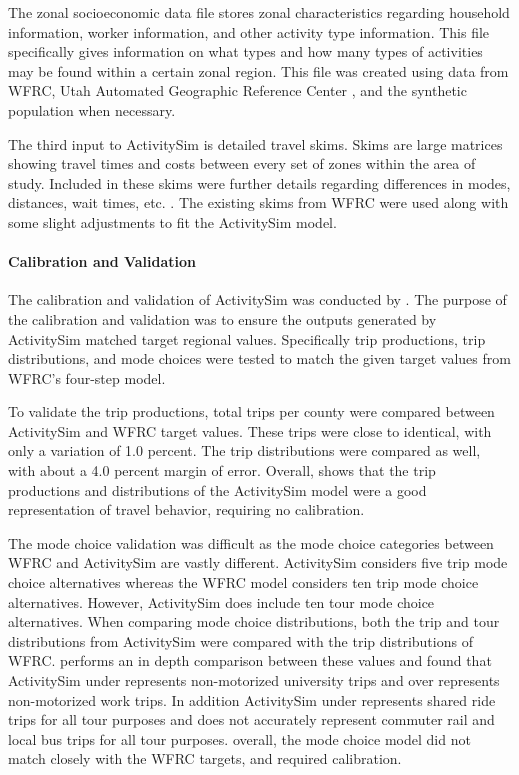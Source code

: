 \documentclass[3p, authoryear, review]{elsarticle} %
\begin{document}
The zonal socioeconomic data file stores zonal characteristics regarding household information, worker information, and other activity type information. This file specifically gives information on what types and how many types of activities may be found within a certain zonal region. This file was created using data from WFRC, Utah Automated Geographic Reference Center \citep{agrc}, and the synthetic population when necessary.

The third input to ActivitySim is detailed travel skims. Skims are large matrices showing travel times and costs between every set of zones within the area of study. Included in these skims were further details regarding differences in modes, distances, wait times, etc. \citep{nate}. The existing skims from WFRC were used along with some slight adjustments to fit the ActivitySim model.

\hypertarget{asimcal}{%
\paragraph{Calibration and Validation}\label{asimcal}}

The calibration and validation of ActivitySim was conducted by \citet{nate}. The purpose of the calibration and validation was to ensure the outputs generated by ActivitySim matched target regional values. Specifically trip productions, trip distributions, and mode choices were tested to match the given target values from WFRC's four-step model.

To validate the trip productions, total trips per county were compared between ActivitySim and WFRC target values. These trips were close to identical, with only a variation of 1.0 percent. The trip distributions were compared as well, with about a 4.0 percent margin of error. Overall, \citet{nate} shows that the trip productions and distributions of the ActivitySim model were a good representation of travel behavior, requiring no calibration.

The mode choice validation was difficult as the mode choice categories between WFRC and ActivitySim are vastly different. ActivitySim considers five trip mode choice alternatives whereas the WFRC model considers ten trip mode choice alternatives. However, ActivitySim does include ten tour mode choice alternatives. When comparing mode choice distributions, both the trip and tour distributions from ActivitySim were compared with the trip distributions of WFRC. \citet{nate} performs an in depth comparison between these values and found that ActivitySim under represents non-motorized university trips and over represents non-motorized work trips. In addition ActivitySim under represents shared ride trips for all tour purposes and does not accurately represent commuter rail and local bus trips for all tour purposes. overall, the mode choice model did not match closely with the WFRC targets, and required calibration.
\end{document}
